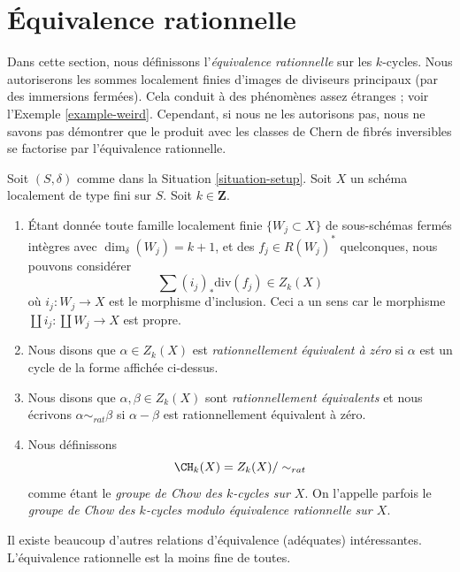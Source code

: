 \section{Équivalence rationnelle}
\label{section-rational-equivalence}

\noindent
Dans cette section, nous définissons l'{\it équivalence rationnelle} sur les $k$-cycles.
Nous autoriserons les sommes localement finies d'images de
diviseurs principaux (par des immersions fermées). Cela conduit à des
phénomènes assez étranges ; voir l'Exemple \ref{example-weird}.
Cependant, si nous ne les autorisons pas, nous ne savons pas démontrer que
le produit avec les classes de Chern de fibrés inversibles se factorise par l'équivalence
rationnelle.

\begin{definition}
\label{definition-rational-equivalence}
Soit $(S, \delta)$ comme dans la Situation \ref{situation-setup}.
Soit $X$ un schéma localement de type fini sur $S$.
Soit $k \in \mathbf{Z}$.
\begin{enumerate}
\item Étant donnée toute famille localement finie $\{W_j \subset X\}$
de sous-schémas fermés intègres avec $\dim_\delta(W_j) = k + 1$,
et des $f_j \in R(W_j)^*$ quelconques, nous pouvons considérer
$$
\sum (i_j)_*\text{div}(f_j) \in Z_k(X)
$$
où $i_j : W_j \to X$ est le morphisme d'inclusion.
Ceci a un sens car le morphisme
$\coprod i_j : \coprod W_j \to X$ est propre.
\item Nous disons que $\alpha \in Z_k(X)$ est {\it rationnellement équivalent à zéro}
si $\alpha$ est un cycle de la forme affichée ci-dessus.
\item Nous disons que $\alpha, \beta \in Z_k(X)$ sont
{\it rationnellement équivalents} et nous écrivons $\alpha \sim_{rat} \beta$
si $\alpha - \beta$ est rationnellement équivalent à zéro.
\item Nous définissons
$$
\CH_k(X) = Z_k(X) / \sim_{rat}
$$
comme étant le {\it groupe de Chow des $k$-cycles sur $X$}. On l'appelle parfois
le {\it groupe de Chow des $k$-cycles modulo équivalence rationnelle sur $X$}.
\end{enumerate}
\end{definition}

\noindent
Il existe beaucoup d'autres relations d'équivalence (adéquates) intéressantes.
L'équivalence rationnelle est la moins fine de toutes.

